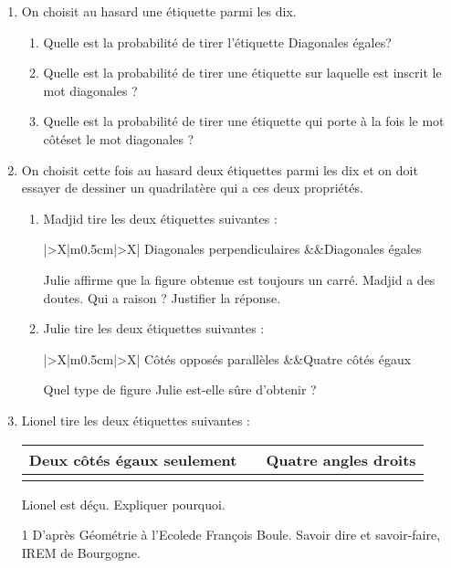 \begin{enumerate}
\item On choisit au hasard une étiquette parmi les dix. 
	\begin{enumerate}
		\item Quelle est la probabilité de tirer l'étiquette \og Diagonales égales\fg ? 
		\item Quelle est la probabilité de tirer une étiquette sur laquelle est inscrit le mot \og diagonales \fg{} ? 
		\item Quelle est la probabilité de tirer une étiquette qui porte à la fois le mot \og côtés\fg et le mot \og diagonales \fg{} ? 
	\end{enumerate}
\item On choisit cette fois au hasard deux étiquettes parmi les dix et on doit essayer de dessiner un quadrilatère qui a ces deux propriétés. 
	\begin{enumerate}
		\item Madjid tire les deux étiquettes suivantes : 
		
\smallskip
{\footnotesize\begin{tabularx}{\linewidth} {|>{\centering \arraybackslash}X|m{0.5cm}|>{\centering \arraybackslash}X|}
Diagonales perpendiculaires &&Diagonales égales\\ 
\end{tabularx}}
\smallskip

Julie affirme que la figure obtenue est toujours un carré. Madjid a des doutes. Qui a raison ? Justifier la réponse. 
		\item Julie tire les deux étiquettes suivantes :
		 
\smallskip
{\footnotesize\begin{tabularx}{\linewidth} {|>{\centering \arraybackslash}X|m{0.5cm}|>{\centering \arraybackslash}X|}
Côtés opposés parallèles &&Quatre côtés égaux \\ 
\end{tabularx}}
\smallskip

Quel type de figure Julie est-elle sûre d'obtenir ? 
	\end{enumerate}
		\item Lionel tire les deux étiquettes suivantes :
		 
\smallskip
{\footnotesize \begin{tabularx}{\linewidth} {|>{\centering \arraybackslash}X|m{}|>{\centering \arraybackslash}X|}\cline{1-1}\cline{3-3}
Deux côtés égaux seulement &&Quatre angles droits\\ \cline{1-1}\cline{3-3}
\end{tabularx}}
\smallskip

Lionel est déçu. Expliquer pourquoi. 

\medskip

1 {\scriptsize D'après \og Géométrie à l'Ecole\fg de François Boule. Savoir dire et savoir-faire, IREM de Bourgogne.} 
\end{enumerate}

\bigskip

